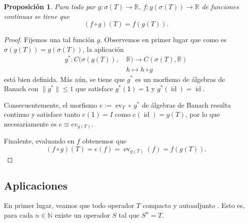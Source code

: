 \documentclass[11pt]{report}
\theoremstyle{colored}
\newtheorem{proposition}{Proposición}[section]
\newcommand{\N}{\mathbb{N}}
\newcommand{\R}{\mathbb{R}}
\newcommand{\ev}{\operatorname{ev}}
\newcommand{\id}{\operatorname{id}}
\begin{document}
\begin{proposition} Para todo par $g : \sigma(T) \to \R$, $f : g(\sigma(T)) \to \R$ de funciones continuas se tiene que \[(f \circ g)(T) = f(g(T)).\]
\end{proposition}
\begin{proof} Fijemos una tal función $g$. Observemos en primer lugar que como es $\sigma(g(T)) = g(\sigma(T))$, la aplicación
\begin{align*}
g^* : C(\sigma(g(T)), \ &\R) \to C(\sigma(T),\R)\\
&h \longmapsto h \circ g
\end{align*}
está bien definida. Más aún, se tiene que $g^*$ es un morfismo de álgebras de Banach con $\|g^*\| \leq 1$ que satisface $g^*(\mathsf{1}) = \mathsf{1}$ y $g^*(\id) = \id$.

Consecuentemente, el morfismo $e := \ev_T \circ \ g^*$ de álgebras de Banach resulta continuo y satisface tanto $e(\mathsf{1}) = I$ como $e(\id) = g(T)$, por lo que necesariamente es $e \equiv ev_{g(T)}$. 

Finalente, evaluando en $f$ obtenemos que
\[
(f \circ g)(T) = e(f) = \ev_{g(T)}(f) = f(g(T)).
\]
\end{proof}

\subsection{Aplicaciones}

En primer lugar, veamos que todo operador $T$ compacto y autoadjunto . Esto es, para cada $n \in \N$ existe un operador $S$ tal que $S^n = T$.
\end{document}
